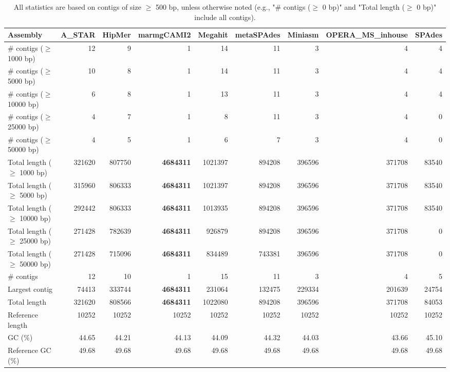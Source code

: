 \documentclass[12pt,a4paper]{article}
\begin{document}
\begin{table}[ht]
\begin{center}
\caption{All statistics are based on contigs of size $\geq$ 500 bp, unless otherwise noted (e.g., "\# contigs ($\geq$ 0 bp)" and "Total length ($\geq$ 0 bp)" include all contigs).}
\begin{tabular}{|l*{8}{|r}|}
\hline
Assembly & A\_STAR & HipMer & marmgCAMI2 & Megahit & metaSPAdes & Miniasm & OPERA\_MS\_inhouse & SPAdes \\ \hline
\# contigs ($\geq$ 1000 bp) & 12 & 9 & 1 & 14 & 11 & 3 & 4 & 4 \\ \hline
\# contigs ($\geq$ 5000 bp) & 10 & 8 & 1 & 14 & 11 & 3 & 4 & 4 \\ \hline
\# contigs ($\geq$ 10000 bp) & 6 & 8 & 1 & 13 & 11 & 3 & 4 & 4 \\ \hline
\# contigs ($\geq$ 25000 bp) & 4 & 7 & 1 & 8 & 11 & 3 & 4 & 0 \\ \hline
\# contigs ($\geq$ 50000 bp) & 4 & 5 & 1 & 6 & 7 & 3 & 4 & 0 \\ \hline
Total length ($\geq$ 1000 bp) & 321620 & 807750 & {\bf 4684311} & 1021397 & 894208 & 396596 & 371708 & 83540 \\ \hline
Total length ($\geq$ 5000 bp) & 315960 & 806333 & {\bf 4684311} & 1021397 & 894208 & 396596 & 371708 & 83540 \\ \hline
Total length ($\geq$ 10000 bp) & 292442 & 806333 & {\bf 4684311} & 1013935 & 894208 & 396596 & 371708 & 83540 \\ \hline
Total length ($\geq$ 25000 bp) & 271428 & 782639 & {\bf 4684311} & 926879 & 894208 & 396596 & 371708 & 0 \\ \hline
Total length ($\geq$ 50000 bp) & 271428 & 715096 & {\bf 4684311} & 834489 & 743381 & 396596 & 371708 & 0 \\ \hline
\# contigs & 12 & 10 & 1 & 15 & 11 & 3 & 4 & 5 \\ \hline
Largest contig & 74413 & 333744 & {\bf 4684311} & 231064 & 132475 & 229334 & 201639 & 24754 \\ \hline
Total length & 321620 & 808566 & {\bf 4684311} & 1022080 & 894208 & 396596 & 371708 & 84053 \\ \hline
Reference length & 10252 & 10252 & 10252 & 10252 & 10252 & 10252 & 10252 & 10252 \\ \hline
GC (\%) & 44.65 & 44.21 & 44.13 & 44.09 & 44.32 & 44.03 & 43.66 & 45.10 \\ \hline
Reference GC (\%) & 49.68 & 49.68 & 49.68 & 49.68 & 49.68 & 49.68 & 49.68 & 49.68 \\ \hline

\end{tabular}
\end{center}
\end{table}
\end{document}
